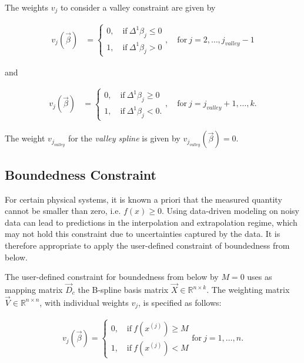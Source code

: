 The weights $v_j$ to consider a valley constraint are given by

\begin{align}\label{eq:v_valley_1}
	v_j(\vec{\beta}) &= \begin{cases} 
		0, \quad \text{if} \ \Delta^1\beta_j \le 0 \\ 
		1, \quad \text{if} \ \Delta^1\beta_j > 0
	\end{cases}, \quad \text{for} \ j=2, \dots, j_{valley}-1
\end{align}

and 

\begin{align}\label{eq:v_valley_2}
	v_j(\vec{\beta}) &= \begin{cases} 
		0, \quad \text{if} \ \Delta^1\beta_j \ge 0 \\ 
		1, \quad \text{if} \ \Delta^1\beta_j < 0.
	\end{cases}, \quad \text{for} \  j=j_{valley}+1, \dots, k.
\end{align}

The weight $v_{j_{valley}}$ for the \emph{valley spline} is given by $v_{j_{valley}}(\vec{\beta}) = 0$.

\subsection{Boundedness Constraint}

For certain physical systems, it is known a priori that the measured quantity cannot be smaller than zero, i.e. $f(x) \ge 0$. Using data-driven modeling on noisy data can lead to predictions in the interpolation and extrapolation regime, which may not hold this constraint due to uncertainties captured by the data. It is therefore appropriate to apply the user-defined constraint of boundedness from below.

The user-defined constraint for boundedness from below by $M=0$ uses as mapping matrix $\vec{D}_c$ the B-spline basis matrix $\vec{X} \in \mathbb{R}^{n \times k}$. The weighting matrix $\vec{V} \in \mathbb{R}^{n\times n}$, with individual weights $v_j$, is specified as follows:

\begin{align} \label{eq:v_boundedness}
	v_j(\vec{\beta}) = \begin{cases} 
		0, \quad \text{if} \ f(x^{(j)}) \ge M\\ 
		1, \quad \text{if} \ f(x^{(j)})  < M 		
	\end{cases} \text{for} \ j=1, \dots, n.
\end{align}

